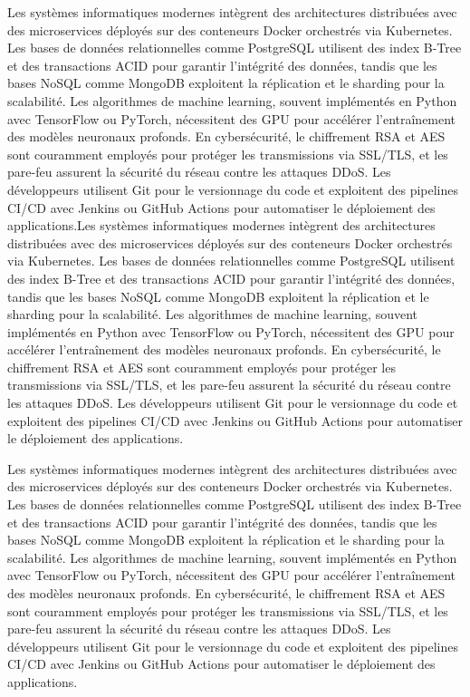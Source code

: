 Les systèmes informatiques modernes intègrent des architectures distribuées avec des microservices déployés sur des conteneurs Docker orchestrés via Kubernetes. Les bases de données relationnelles comme PostgreSQL utilisent des index B-Tree et des transactions ACID pour garantir l'intégrité des données, tandis que les bases NoSQL comme MongoDB exploitent la réplication et le sharding pour la scalabilité. Les algorithmes de machine learning, souvent implémentés en Python avec TensorFlow ou PyTorch, nécessitent des GPU pour accélérer l'entraînement des modèles neuronaux profonds. En cybersécurité, le chiffrement RSA et AES sont couramment employés pour protéger les transmissions via SSL/TLS, et les pare-feu assurent la sécurité du réseau contre les attaques DDoS. Les développeurs utilisent Git pour le versionnage du code et exploitent des pipelines CI/CD avec Jenkins ou GitHub Actions pour automatiser le déploiement des applications.Les systèmes informatiques modernes intègrent des architectures distribuées avec des microservices déployés sur des conteneurs Docker orchestrés via Kubernetes. Les bases de données relationnelles comme PostgreSQL utilisent des index B-Tree et des transactions ACID pour garantir l'intégrité des données, tandis que les bases NoSQL comme MongoDB exploitent la réplication et le sharding pour la scalabilité. Les algorithmes de machine learning, souvent implémentés en Python avec TensorFlow ou PyTorch, nécessitent des GPU pour accélérer l'entraînement des modèles neuronaux profonds. En cybersécurité, le chiffrement RSA et AES sont couramment employés pour protéger les transmissions via SSL/TLS, et les pare-feu assurent la sécurité du réseau contre les attaques DDoS. Les développeurs utilisent Git pour le versionnage du code et exploitent des pipelines CI/CD avec Jenkins ou GitHub Actions pour automatiser le déploiement des applications.

Les systèmes informatiques modernes intègrent des architectures distribuées avec des microservices déployés sur des conteneurs Docker orchestrés via Kubernetes. Les bases de données relationnelles comme PostgreSQL utilisent des index B-Tree et des transactions ACID pour garantir l'intégrité des données, tandis que les bases NoSQL comme MongoDB exploitent la réplication et le sharding pour la scalabilité. Les algorithmes de machine learning, souvent implémentés en Python avec TensorFlow ou PyTorch, nécessitent des GPU pour accélérer l'entraînement des modèles neuronaux profonds. En cybersécurité, le chiffrement RSA et AES sont couramment employés pour protéger les transmissions via SSL/TLS, et les pare-feu assurent la sécurité du réseau contre les attaques DDoS. Les développeurs utilisent Git pour le versionnage du code et exploitent des pipelines CI/CD avec Jenkins ou GitHub Actions pour automatiser le déploiement des applications.